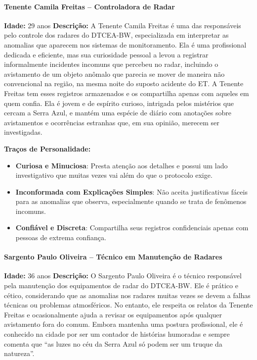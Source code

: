 \paragraph{Tenente Camila Freitas – Controladora de Radar}  
\textbf{Idade:} 29 anos  
\textbf{Descrição:}  
A Tenente Camila Freitas é uma das responsáveis pelo controle dos radares do DTCEA-BW, especializada em interpretar as anomalias que aparecem nos sistemas de monitoramento. Ela é uma profissional dedicada e eficiente, mas sua curiosidade pessoal a levou a registrar informalmente incidentes incomuns que percebeu no radar, incluindo o avistamento de um objeto anômalo que parecia se mover de maneira não convencional na região, na mesma noite do suposto acidente do ET. A Tenente Freitas tem esses registros armazenados e os compartilha apenas com aqueles em quem confia. Ela é jovem e de espírito curioso, intrigada pelos mistérios que cercam a Serra Azul, e mantém uma espécie de diário com anotações sobre avistamentos e ocorrências estranhas que, em sua opinião, merecem ser investigadas.

\textbf{Traços de Personalidade:}
\begin{itemize}
    \item \textbf{Curiosa e Minuciosa}: Presta atenção aos detalhes e possui um lado investigativo que muitas vezes vai além do que o protocolo exige.
    \item \textbf{Inconformada com Explicações Simples}: Não aceita justificativas fáceis para as anomalias que observa, especialmente quando se trata de fenômenos incomuns.
    \item \textbf{Confiável e Discreta}: Compartilha seus registros confidenciais apenas com pessoas de extrema confiança.
\end{itemize}

\paragraph{Sargento Paulo Oliveira – Técnico em Manutenção de Radares}  
\textbf{Idade:} 36 anos  
\textbf{Descrição:}  
O Sargento Paulo Oliveira é o técnico responsável pela manutenção dos equipamentos de radar do DTCEA-BW. Ele é prático e cético, considerando que as anomalias nos radares muitas vezes se devem a falhas técnicas ou problemas atmosféricos. No entanto, ele respeita os relatos da Tenente Freitas e ocasionalmente ajuda a revisar os equipamentos após qualquer avistamento fora do comum. Embora mantenha uma postura profissional, ele é conhecido na cidade por ser um contador de histórias humoradas e sempre comenta que ``as luzes no céu da Serra Azul só podem ser um truque da natureza''.


